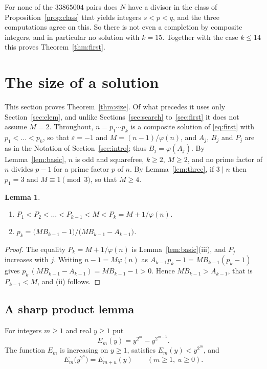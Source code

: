 \documentclass[11pt,reqno]{amsart}
\numberwithin{equation}{section}
\theoremstyle{plain}
\newtheorem{lemma}[theorem]{Lemma}
\theoremstyle{definition}
\theoremstyle{remark}
\begin{document}
For none of the $33865004$ pairs does $N$ have a divisor in the class of
Proposition~\ref{prop:class} that yields integers $s<p<q$, and the
three computations agree on this. So there is
not even a completion by composite integers, and in particular no
solution with $k=15$. Together with the case $k\le14$ this proves
Theorem~\ref{thm:first}.

\section{The size of a solution}\label{sec:size}

This section proves Theorem~\ref{thm:size}. Of what precedes it uses
only Section~\ref{sec:elem}, and unlike Sections~\ref{sec:search}
to~\ref{sec:first} it does not assume $M=2$. Throughout,
$n=p_1\cdots p_k$ is a composite solution of \eqref{eq:first} with
$p_1<\dots<p_k$, so that $\varepsilon=-1$ and $M=(n-1)/\varphi(n)$,
and $A_j$, $B_j$ and $P_j$ are as in the Notation of
Section~\ref{sec:intro}; thus $B_j=\varphi(A_j)$. By
Lemma~\ref{lem:basic}, $n$ is odd and squarefree, $k\ge2$, $M\ge2$,
and no prime factor of $n$ divides $p-1$ for a prime factor $p$ of
$n$. By Lemma~\ref{lem:three}, if $3\mid n$ then $p_1=3$ and
$M\equiv1\pmod3$, so that $M\ge4$.

\begin{lemma}\label{lem:sizefacts}
\begin{enumerate}[label=\textup{(\roman*)}]
\item $P_1<P_2<\dots<P_{k-1}<M<P_k=M+1/\varphi(n)$.
\item $p_k=\bigl(MB_{k-1}-1\bigr)/\bigl(MB_{k-1}-A_{k-1}\bigr)$.
\end{enumerate}
\end{lemma}

\begin{proof}
The equality $P_k=M+1/\varphi(n)$ is Lemma~\ref{lem:basic}(iii), and
$P_j$ increases with $j$. Writing $n-1=M\varphi(n)$ as
$A_{k-1}p_k-1=MB_{k-1}(p_k-1)$ gives
$p_k\,(MB_{k-1}-A_{k-1})=MB_{k-1}-1>0$. Hence $MB_{k-1}>A_{k-1}$, that
is $P_{k-1}<M$, and (ii) follows.
\end{proof}

\subsection{A sharp product lemma}\label{sec:product}
For integers $m\ge1$ and real $y\ge1$ put
\[
  E_m(y)=y^{2^m}-y^{2^{m-1}} .
\]
The function $E_m$ is increasing on $y\ge1$, satisfies
$E_m(y)<y^{2^m}$, and
\begin{equation}\label{eq:Ecomp}
  E_m\bigl(y^{2^u}\bigr)=E_{m+u}(y)\qquad(m\ge1,\ u\ge0).
\end{equation}
\end{document}
